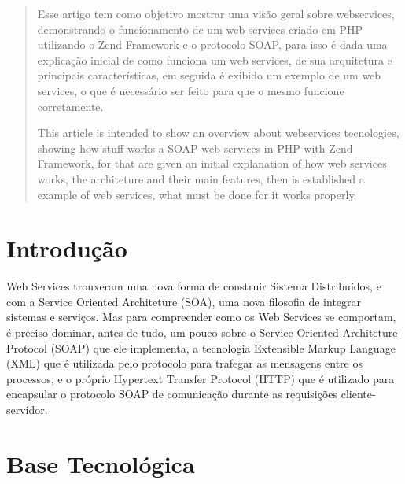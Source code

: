 \documentclass{acm_proc_article-sp}
\begin{document}
\maketitle
\begin{abstract}
		Esse artigo tem como objetivo mostrar uma visão geral sobre webservices, demonstrando o funcionamento de um web services criado em PHP utilizando o Zend Framework e o protocolo SOAP, para isso é dada uma explicação inicial de como funciona um web services, de sua arquitetura e principais características, em seguida é exibido um exemplo de um web services, o que é necessário ser feito para que o mesmo funcione corretamente.
		
		
		This article is intended to show an overview about webservices tecnologies, showing how stuff works a SOAP web services in PHP with Zend Framework, for that are given an initial explanation of how web services works, the architeture and their main features, then is established a example of  web services, what must be done for it works properly.
			
\end{abstract}





\section{Introdução}
		Web Services trouxeram uma nova forma de construir Sistema Distribuídos, e com a Service Oriented Architeture (SOA), uma nova filosofia de integrar sistemas e serviços. Mas para compreender como os Web Services se comportam, é preciso dominar, antes de tudo, um pouco sobre o Service Oriented Architeture Protocol (SOAP) que ele implementa, a tecnologia Extensible Markup Language (XML) que é utilizada pelo protocolo para trafegar as mensagens entre os processos, e o próprio Hypertext Transfer Protocol (HTTP) que é utilizado para encapsular o protocolo SOAP de comunicação durante as requisições cliente-servidor.
		
		
\section{Base Tecnológica}
		
\end{document}
